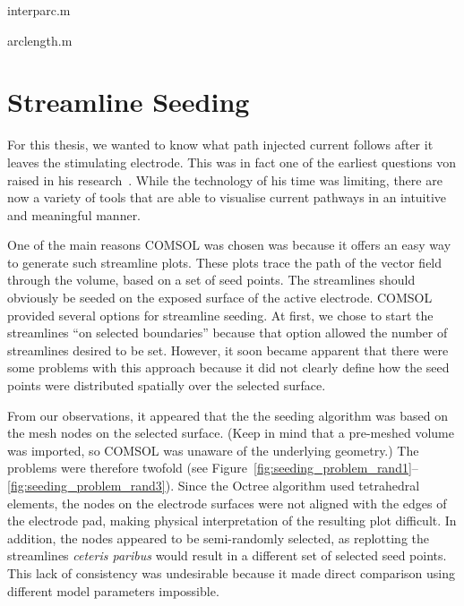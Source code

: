 \begin{appendices}
\setstretchcode

interparc.m


\clearpage

arclength.m


\setstretchnormal


\chapter{Streamline Seeding}
\label{appendix:streamline_seeding} %


For this thesis, we wanted to know what path injected current follows after it
leaves the stimulating electrode. This was in fact one of the earliest questions
von \bekesy{} raised in his research~\cite{vonbekesy1951}. While the technology
of his time was limiting, there are now a variety of tools that are able to
visualise current pathways in an intuitive and meaningful manner.

One of the main reasons COMSOL was chosen was because it offers an easy way to
generate such streamline plots. These plots trace the path of the vector field
through the volume, based on a set of seed points. The streamlines should
obviously be seeded on the exposed surface of the active electrode. COMSOL
provided several options for streamline seeding. At first, we chose to start the
streamlines ``on selected boundaries'' because that option allowed the number of
streamlines desired to be set. However, it soon became apparent that there were
some problems with this approach because it did not clearly define how the seed
points were distributed spatially over the selected surface.

From our observations, it appeared that the the seeding algorithm was based on
the mesh nodes on the selected surface. (Keep in mind that a pre-meshed volume
was imported, so COMSOL was unaware of the underlying geometry.) The problems
were therefore twofold (see
Figure~\ref{fig:seeding_problem_rand1}--\ref{fig:seeding_problem_rand3}).
Since the Octree algorithm used tetrahedral elements, the nodes on the electrode
surfaces were not aligned with the edges of the electrode pad, making physical
interpretation of the resulting plot difficult. In addition, the nodes appeared
to be semi-randomly selected, as replotting the streamlines \textit{ceteris
paribus} would result in a different set of selected seed points. This lack of
consistency was undesirable because it made direct comparison using different
model parameters impossible.


\end{appendices}
